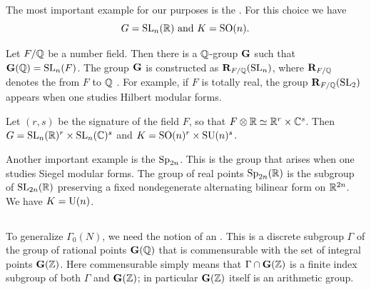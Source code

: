 \begin{example}
The most important example for our purposes is 
the .  For this choice we have 
\[
\text{$G=\operatorname{SL}_{n} (\mathbb{R})$ and $K=\operatorname{SO} (n)$.}
\]
\end{example}

\begin{example}\label{ex:resofscalars}
Let $F/\mathbb{Q}$ be a number field.  Then there is a $\mathbb{Q}$-group $\mathbf{G}$ such
that $\mathbf{G} (\mathbb{Q}) = \operatorname{SL}_{n} (F)$.  The group $\mathbf{G}$ is constructed as
$\mathbf{R}_{F/\mathbb{Q} } (\operatorname{SL}_{n})$, where $\mathbf{R}_{F/\mathbb{Q} }$ denotes the
 from $F$ to $\mathbb{Q}$
\cite[\S2.1.2]{plat.rapin}.  For example, if $F$ is totally real, the
group $\mathbf{R}_{F/\mathbb{Q}} (\operatorname{SL}_{2})$ appears when one studies Hilbert modular
forms.

Let $(r,s)$ be the signature of the field $F$, so that $F\otimes \mathbb{R}
\simeq \mathbb{R}^{r}\times \mathbb{C}^s$.  Then $G = \operatorname{SL}_n (\mathbb{R})^{r} \times \operatorname{SL}_n
(\mathbb{C})^{s}$ and $K = \operatorname{SO} (n)^{r}\times \operatorname{SU}(n)^{s}$.
\end{example}


\begin{example}
Another important example is the 
$\operatorname{Sp}_{2n}$.  This is the group that arises when one studies Siegel
modular forms.  The group of real points $\operatorname{Sp}_{2n} (\mathbb{R})$ is the
subgroup of $\operatorname{SL}_{2n} (\mathbb{R})$ preserving a fixed nondegenerate
alternating bilinear form on $\mathbb{R}^{2n}$.  We have $K = \operatorname{U} (n)$.
\end{example}

\subsection{}
%
To generalize $\Gamma_{0} (N)$, we need the notion of an
.  This is a discrete subgroup $\Gamma$ of the
group of rational points $\mathbf{G} (\mathbb{Q})$ that is commensurable with the set
of integral points $\mathbf{G} (\mathbb{Z})$.  Here commensurable simply means that
$\Gamma \cap \mathbf{G} (\mathbb{Z})$ is a finite index subgroup of both $\Gamma$ and
$\mathbf{G} (\mathbb{Z})$; in particular $\mathbf{G} (\mathbb{Z})$ itself is an arithmetic group.

